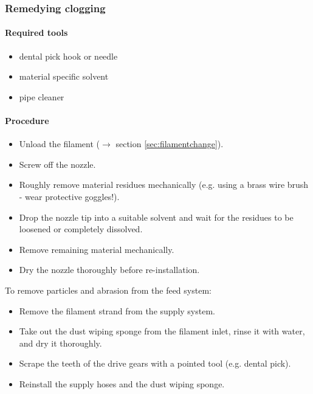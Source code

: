 \subsubsection{Remedying clogging}

\paragraph{Required tools}

\begin{itemize}
  \item dental pick hook or needle
  \item material specific solvent
  \item pipe cleaner
\end{itemize}

\paragraph{Procedure}

\begin{itemize}  
  \item Unload the filament ($\rightarrow$ section \ref{sec:filamentchange}).
  \item Screw off the nozzle.
  \item Roughly remove material residues mechanically (e.g. using a brass wire brush - wear protective goggles!).
  \item Drop the nozzle tip into a suitable solvent and wait for the residues to be loosened or completely dissolved.
  \item Remove remaining material mechanically.
  \item Dry the nozzle thoroughly before re-installation.
\end{itemize}

To remove particles and abrasion from the feed system:

\begin{itemize} 
  \item Remove the filament strand from the supply system.
  \item Take out the dust wiping sponge from the filament inlet, rinse it with water, and dry it thoroughly.
  \item  Scrape the teeth of the drive gears with a pointed tool (e.g. dental pick).
  \item  Reinstall the supply hoses and the dust wiping sponge.
\end{itemize}

